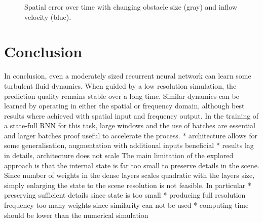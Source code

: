 \documentclass[sigconf]{acmart}
\begin{document}
\begin{figure}
	\caption{Spatial error over time with changing obstacle size (gray) and inflow velocity (blue).}
	\label{inflVelSteps}
\end{figure}

\section{Conclusion}
In conclusion, even a moderately sized recurrent neural network can learn some turbulent fluid dynamics. When guided by a low resolution simulation, the prediction quality remains stable over a long time.
Similar dynamics can be learned by operating in either the spatial or frequency domain, although best results where achieved with spatial input and frequency output.
In the training of a state-full RNN for this task, large windows and the use of batches are essential and larger batches proof useful to accelerate the process.
* architecture allows for some generalisation, augmentation with additional inputs beneficial
* results lag in details, architecture does not scale
The main limitation of the explored approach is that the internal state is far too small to preserve details in the scene. Since number of weights in the dense layers scales quadratic with the layers size, simply enlarging the state to the scene resolution is not feasible.
In particular 
* preserving sufficient details since state is too small
* producing full resolution frequency too many weights since similarity can not be used
* computing time should be lower than the numerical simulation
\end{document}
